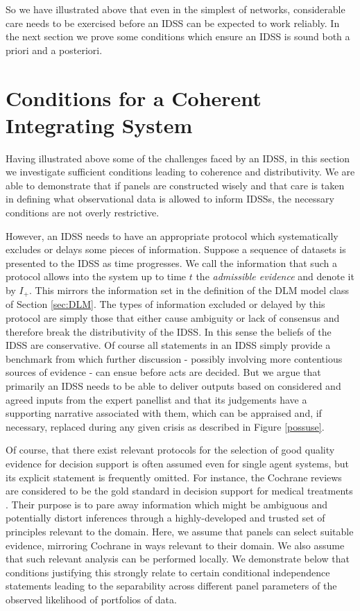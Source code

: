 So we have illustrated above that even in the simplest of networks, considerable care needs to be exercised before an IDSS can be expected to work reliably. In the next section we prove some conditions which ensure an IDSS is sound both a priori and a posteriori.

\section{Conditions for a Coherent Integrating System}
\label{sec:conditions}

Having illustrated above some of the challenges faced by an IDSS, in this section we investigate sufficient conditions leading to coherence and distributivity. We are able to demonstrate that if  panels are constructed wisely and that care is taken in defining what observational data is allowed to inform IDSSs, the necessary conditions are not overly restrictive.

However, an IDSS needs to have an appropriate protocol which systematically excludes or delays some pieces of information. Suppose a sequence of datasets is presented to the IDSS as time progresses. We call the information that such a  protocol allows into the system up to time $t$ the \emph{admissible evidence} and denote it by $I_{+}$. This mirrors the information set in the definition of the DLM model class of Section \ref{sec:DLM}. The types of information excluded or delayed by this protocol are simply those that either cause ambiguity or lack of consensus and therefore break the distributivity of the IDSS. In this sense the beliefs of the IDSS are conservative. Of course all statements in an IDSS simply provide a benchmark from which further discussion - possibly involving  more contentious sources of evidence - can ensue before acts are decided. But we argue that primarily an IDSS needs to be able to deliver outputs based on considered and agreed inputs from the expert panellist and that its judgements  have a supporting narrative associated with them, which can be appraised and, if necessary, replaced during any given crisis as described in Figure \ref{possuse}.

Of course, that there exist relevant protocols for the selection of good quality evidence for decision support is often assumed even for single agent systems, but its explicit statement is frequently omitted. For instance, the Cochrane reviews are considered to be the gold standard in decision support for medical treatments  \citep{Higgins2008}. Their purpose is to pare away information which might be ambiguous and potentially distort inferences through a highly-developed and trusted set of principles relevant to the domain.  Here, we assume that panels can select suitable evidence, mirroring Cochrane in ways relevant to their domain. We also assume that such relevant analysis can be performed locally. We demonstrate below that conditions justifying this strongly relate to certain conditional independence statements leading  to the separability across different panel parameters of the observed likelihood of portfolios of data.


